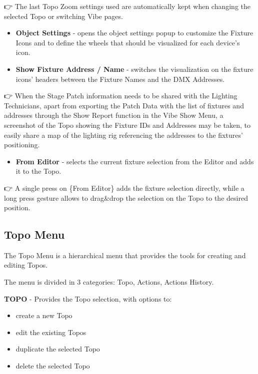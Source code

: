 \documentclass[
]{article}
\providecommand{\tightlist}{%
  \setlength{\itemsep}{0pt}\setlength{\parskip}{0pt}}
\begin{document}
👉 The last Topo Zoom settings used are automatically kept when changing the selected Topo or switching Vibe pages.

\begin{itemize}
\tightlist
\item
  \textbf{Object Settings} - opens the object settings popup to customize the Fixture Icons and to define the wheels that should be visualized for each device's icon.
\end{itemize}

\begin{itemize}
\tightlist
\item
  \textbf{Show Fixture Address / Name} - switches the visualization on the fixture icons' headers between the Fixture Names and the DMX Addresses.
\end{itemize}

👉 When the Stage Patch information needs to be shared with the Lighting Technicians, apart from exporting the Patch Data with the list of fixtures and addresses through the Show Report function in the Vibe Show Menu, a screenshot of the Topo showing the Fixture IDs and Addresses may be taken, to easily share a map of the lighting rig referencing the addresses to the fixtures' positioning.

\begin{itemize}
\tightlist
\item
  \textbf{From Editor} - selects the current fixture selection from the Editor and adds it to the Topo.
\end{itemize}

👉 A single press on \{From Editor\} adds the fixture selection directly, while a long press gesture allows to drag\&drop the selection on the Topo to the desired position.

\hypertarget{Topo-Menu-15.2}{%
\subsection{Topo Menu}\label{Topo-Menu-15.2}}

The Topo Menu is a hierarchical menu that provides the tools for creating and editing Topos.

The menu is divided in 3 categories: Topo, Actions, Actions History.

\textbf{TOPO} - Provides the Topo selection, with options to:

\begin{itemize}
\item
  create a new Topo
\item
  edit the existing Topos
\item
  duplicate the selected Topo
\item
  delete the selected Topo
\end{itemize}
\end{document}
